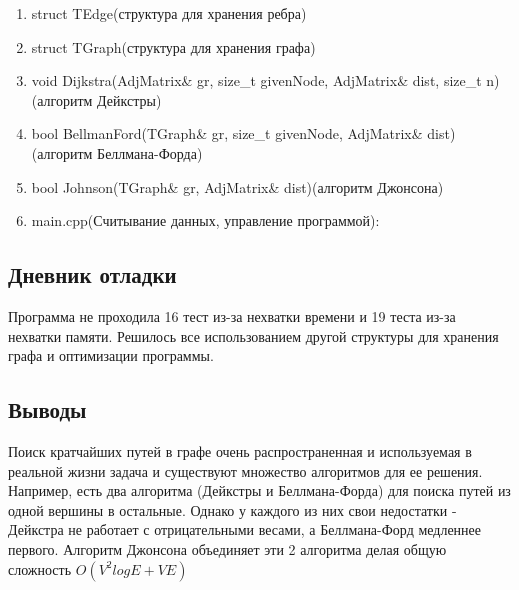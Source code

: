 \documentclass[12pt]{article}
\begin{document}
\begin{enumerate}
\item struct TEdge(структура для хранения ребра)
\item struct TGraph(структура для хранения графа)
\item void Dijkstra(AdjMatrix\& gr, size\_t givenNode, AdjMatrix\& dist, size\_t n)(алгоритм Дейкстры)
\item bool BellmanFord(TGraph\& gr, size\_t givenNode, AdjMatrix\& dist)(алгоритм Беллмана-Форда)
\item bool Johnson(TGraph\& gr, AdjMatrix\& dist)(алгоритм Джонсона)
\item main.cpp(Считывание данных, управление программой):

\end{enumerate}

\subsection*{Дневник отладки}

Программа не проходила 16 тест из-за нехватки времени и 19 теста из-за нехватки памяти. Решилось все использованием другой структуры для хранения графа и оптимизации программы.


\subsection*{Выводы}
\par Поиск кратчайших путей в графе очень распространенная и используемая в реальной жизни задача и существуют множество алгоритмов для ее решения. Например, есть два алгоритма (Дейкстры и Беллмана-Форда) для поиска путей из одной вершины в остальные. Однако у каждого из них свои недостатки - Дейкстра не работает с отрицательными весами, а Беллмана-Форд медленнее первого. Алгоритм Джонсона объединяет эти 2 алгоритма делая общую сложность $O(V^2logE + VE)$
\end{document}
